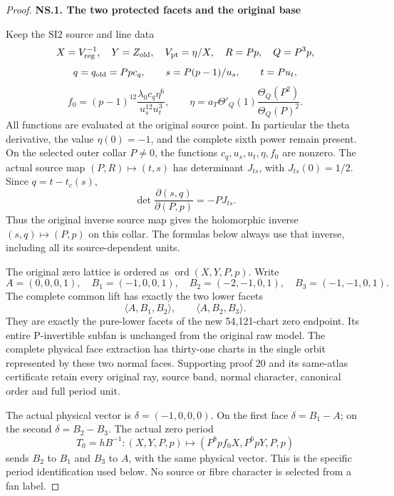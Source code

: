 \begin{proof}
\par

\medskip\noindent\textbf{NS.1. The two protected facets and the original base}

\par\nobreak

Keep the SI2 source and line data
\[
 X=V_{\rm reg}^{-1},\quad Y=Z_{\rm old},\quad
 V_{\rm pt}=\eta/X,\quad R=Pp,\quad Q=P^3p,
\]
\[
 q=q_{\rm old}=Pp c_q,\qquad
 s=P(p-1)/u_s,\qquad t=Pu_t,
\]
\[
 f_0=(p-1)^{12}\frac{\lambda _0c_q\eta^6}{u_s^{12}u_t^3},
 \qquad
 \eta=a_T\Theta'_Q(1)\frac{\Theta_Q(P^2)}{\Theta_Q(P)^2}.
 \tag{NS.1}
\]
All functions are evaluated at the original source point. In particular
the theta derivative, the value \(\eta(0)=-1\), and the complete sixth
power remain present. On the selected outer collar \(P\ne0\), the
functions \(c_q,u_s,u_t,\eta,f_0\) are nonzero. The actual source map
\((P,R)\mapsto(t,s)\) has determinant \(J_{ts}\), with
\(J_{ts}(0)=1/2\). Since \(q=t-t_c(s)\),
\[
 \det\frac{\partial(s,q)}{\partial(P,p)}=-P J_{ts}.
 \tag{NS.2}
\]
Thus the original inverse source map gives the holomorphic inverse
\((s,q)\mapsto(P,p)\) on this collar. The formulas below always use
that inverse, including all its source-dependent units.

The original zero lattice is ordered as
\(\operatorname{ord}(X,Y,P,p)\). Write
\[
 A=(0,0,0,1),\quad B_1=(-1,0,0,1),\quad
 B_2=(-2,-1,0,1),\quad B_3=(-1,-1,0,1).
 \tag{NS.3}
\]
The complete common lift has exactly the two lower facets
\[
 \langle A,B_1,B_2\rangle,\qquad
 \langle A,B_2,B_3\rangle.
 \tag{NS.4}
\]
They are exactly the pure-lower facets of the new 54,121-chart zero
endpoint.  Its entire P-invertible subfan is unchanged from the original
raw model.  The complete physical face extraction has thirty-one charts
in the single orbit represented by these two normal faces.  Supporting
proof 20 and its same-atlas certificate retain every original ray,
source band, normal character, canonical order and full period unit.

The actual physical vector is \(\delta=(-1,0,0,0)\). On the first
face \(\delta=B_1-A\); on the second \(\delta=B_2-B_3\).
The actual zero period
\[
 T_0=hB^{-1}:(X,Y,P,p)\longmapsto
        (P^8p f_0 X,P^6pY,P,p)
 \tag{NS.5}
\]
sends \(B_2\) to \(B_1\) and \(B_3\) to \(A\), with the same
physical vector. This is the specific period identification used below.
No source or fibre character is selected from a fan label.

\par


\end{proof}
